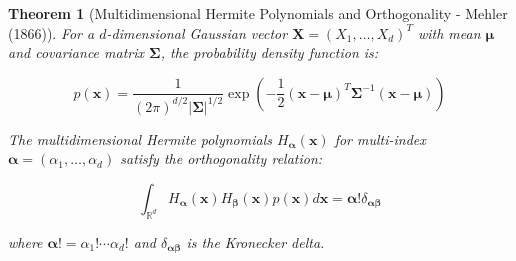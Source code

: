 \documentclass[a4paper]{article}
\theoremstyle{plain}
\newtheorem{theorem}{Theorem}[section]
\theoremstyle{definition}
\theoremstyle{remark}
\begin{document}
\begin{theorem}[Multidimensional Hermite Polynomials and Orthogonality - Mehler (1866)]
\label{thm:multidim_hermite}
For a $d$-dimensional Gaussian vector $\mathbf{X} = (X_1, \ldots, X_d)^T$ with mean $\boldsymbol{\mu}$ and covariance matrix $\boldsymbol{\Sigma}$, the probability density function is:

\begin{equation}
\boxed{p(\mathbf{x}) = \frac{1}{(2\pi)^{d/2}|\boldsymbol{\Sigma}|^{1/2}} \exp\left(-\frac{1}{2}(\mathbf{x}-\boldsymbol{\mu})^T\boldsymbol{\Sigma}^{-1}(\mathbf{x}-\boldsymbol{\mu})\right)} \label{eq:multivariate_gaussian_pdf}
\end{equation}

The multidimensional Hermite polynomials $H_{\boldsymbol{\alpha}}(\mathbf{x})$ for multi-index $\boldsymbol{\alpha} = (\alpha_1, \ldots, \alpha_d)$ satisfy the orthogonality relation:

\begin{equation}
\boxed{\int_{\mathbb{R}^d} H_{\boldsymbol{\alpha}}(\mathbf{x}) H_{\boldsymbol{\beta}}(\mathbf{x}) p(\mathbf{x}) d\mathbf{x} = \boldsymbol{\alpha}! \delta_{\boldsymbol{\alpha}\boldsymbol{\beta}}} \label{eq:orthogonality_multidim}
\end{equation}

where $\boldsymbol{\alpha}! = \alpha_1! \cdots \alpha_d!$ and $\delta_{\boldsymbol{\alpha}\boldsymbol{\beta}}$ is the Kronecker delta.
\end{theorem}
\end{document}
